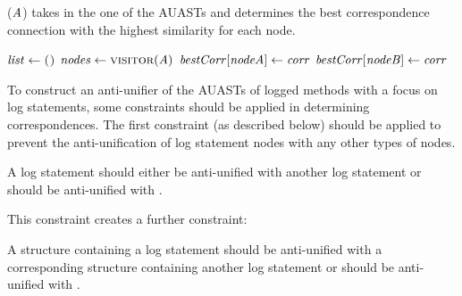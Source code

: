 
\begin{algorithm}
\caption{($\mathit{A}$) takes in the one of the AUASTs and determines the best correspondence connection with the highest similarity for each node.}
\label{alg-determine}
\begin{algorithmic}[1]
\DetermineBest
    \State $\mathit{list} \gets \textsc{()}$
    \State $\mathit{nodes} \gets \textsc{visitor}(\mathit{A})$
			 	\EndFor  	
	   \EndFor	
	   		\State $\mathit{bestCorr}[\mathit{nodeA}] \gets \mathit{corr}$
	   		\State $\mathit{bestCorr}[\mathit{nodeB}] \gets \mathit{corr}$
	   \EndFor
  \end{algorithmic}
\end{algorithm}

To construct an anti-unifier of the AUASTs of logged methods with a focus on log statements, some constraints should be applied in determining correspondences. The first constraint (as described below) should be applied to prevent the anti-unification of log statement nodes with any other types of nodes.
\begin{constraint}
A log statement should either be anti-unified with another log statement or should be anti-unified with \nothing.
\end{constraint}	
	
This constraint creates a further constraint:

\begin{constraint}
A structure containing a log statement should be anti-unified with a corresponding structure containing another log statement or should be anti-unified with \nothing.
\end{constraint}

